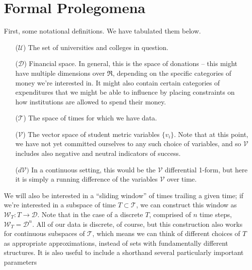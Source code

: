 \documentclass[paper.tex]{subfiles}
\newcommand{\UU}{\mathcal{U}}
\newcommand{\D}{\mathcal{D}}
\newcommand{\V}{\mathcal{V}}
\newcommand{\T}{\mathcal{T}}
\newcommand{\W}{\mathcal{W}}
\begin{document}
	
	\section{Formal Prolegomena}
	
	First, some notational definitions. We have tabulated them below. 
	
	
	\begin{itemize}
		\item[($\UU$)] The set of universities and colleges in question.
		\item[($\D$)] Financial space. In general, this is the space of donations -- this might have multiple dimensions over $\Re$, depending on the specific categories of money we're interested in. It might also contain certain categories of expenditures that we might be able to influence by placing constraints on how institutions are allowed to spend their money.  
		\item[($\T$)] The space of times for which we have data. 
		\item[($\V$)] The vector space of student metric variables $\{v_i\}$. Note that at this point, we have not yet committed ourselves to any such choice of variables, and so $\V$ includes also negative and neutral indicators of success.
		\item[($d\V)$] In a continuous setting, this would be the $\V$ differential 1-form, but here it is simply a running difference of the variables $\V$ over time.  
	\end{itemize}
			
	We will also be interested in a ``sliding window'' of times trailing a given time; if we're interested in a subspace of time $T \subset \T$, we can construct this window as $\W_T : T  \to \D$. Note that in the case of a discrete $T$, comprised of $n$ time steps, $\W_T = \D^n$. All of our data is discrete, of course, but this construction also works for continuous subspaces of $\T$, which means we can think of different choices of $T$ as appropriate approximations, instead of sets with fundamentally different structures. It is also useful to include a shorthand several particularly important parameters
	
\end{document}
